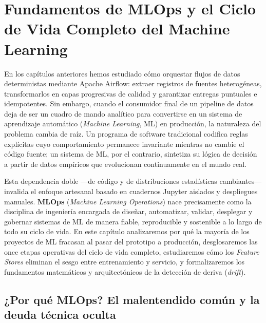 
\chapter[Fundamentos de MLOps y Ciclo de Vida ML]{Fundamentos de MLOps y el Ciclo de Vida Completo del Machine Learning}\label{chap:mlops-ciclo-vida}

En los capítulos anteriores hemos estudiado cómo orquestar flujos de datos deterministas mediante Apache Airflow: extraer registros de fuentes heterogéneas, transformarlos en capas progresivas de calidad y garantizar entregas puntuales e idempotentes. Sin embargo, cuando el consumidor final de un pipeline de datos deja de ser un cuadro de mando analítico para convertirse en un sistema de aprendizaje automático (\textit{Machine Learning}, ML) en producción, la naturaleza del problema cambia de raíz. Un programa de software tradicional codifica reglas explícitas cuyo comportamiento permanece invariante mientras no cambie el código fuente; un sistema de ML, por el contrario, sintetiza su lógica de decisión a partir de datos empíricos que evolucionan continuamente en el mundo real.

Esta dependencia doble ---de código y de distribuciones estadísticas cambiantes--- invalida el enfoque artesanal basado en cuadernos Jupyter aislados y despliegues manuales. \textbf{MLOps} (\textit{Machine Learning Operations}) nace precisamente como la disciplina de ingeniería encargada de diseñar, automatizar, validar, desplegar y gobernar sistemas de ML de manera fiable, reproducible y sostenible a lo largo de todo su ciclo de vida. En este capítulo analizaremos por qué la mayoría de los proyectos de ML fracasan al pasar del prototipo a producción, desglosaremos las once etapas operativas del ciclo de vida completo, estudiaremos cómo los \textit{Feature Stores} eliminan el sesgo entre entrenamiento y servicio, y formalizaremos los fundamentos matemáticos y arquitectónicos de la detección de deriva (\textit{drift}).

\section[¿Por qué MLOps? Deuda técnica oculta]{¿Por qué MLOps? El malentendido común y la deuda técnica oculta}\label{sec:mlops-deuda-tecnica}

